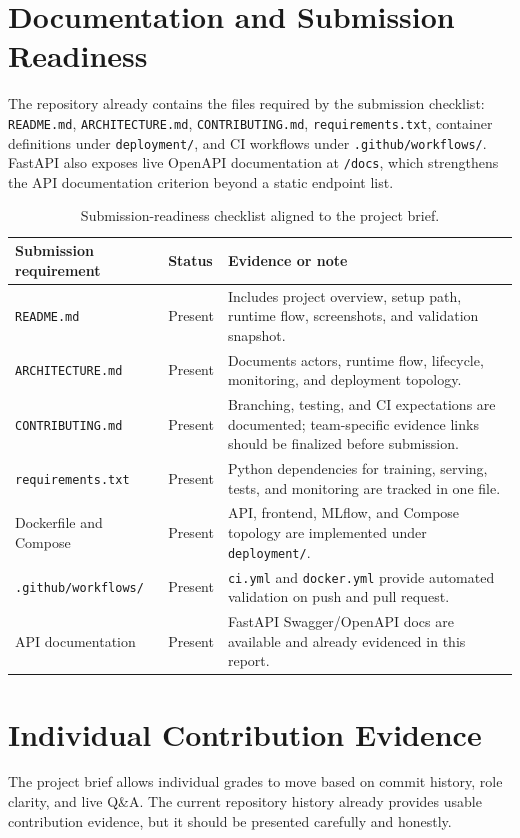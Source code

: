 \documentclass[11pt]{article}
\newcommand{\code}[1]{\texttt{#1}}
\begin{document}
\section{Documentation and Submission Readiness}
The repository already contains the files required by the submission checklist: \code{README.md}, \code{ARCHITECTURE.md}, \code{CONTRIBUTING.md}, \code{requirements.txt}, container definitions under \code{deployment/}, and CI workflows under \code{.github/workflows/}. FastAPI also exposes live OpenAPI documentation at \code{/docs}, which strengthens the API documentation criterion beyond a static endpoint list.

\begin{table}[H]
\small
\centering
\begin{tabularx}{\textwidth}{p{}p{}X}
\toprule
Submission requirement & Status & Evidence or note \\
\midrule
\code{README.md} & Present & Includes project overview, setup path, runtime flow, screenshots, and validation snapshot. \\
\code{ARCHITECTURE.md} & Present & Documents actors, runtime flow, lifecycle, monitoring, and deployment topology. \\
\code{CONTRIBUTING.md} & Present & Branching, testing, and CI expectations are documented; team-specific evidence links should be finalized before submission. \\
\code{requirements.txt} & Present & Python dependencies for training, serving, tests, and monitoring are tracked in one file. \\
Dockerfile and Compose & Present & API, frontend, MLflow, and Compose topology are implemented under \code{deployment/}. \\
\code{.github/workflows/} & Present & \code{ci.yml} and \code{docker.yml} provide automated validation on push and pull request. \\
API documentation & Present & FastAPI Swagger/OpenAPI docs are available and already evidenced in this report. \\
\bottomrule
\end{tabularx}
\caption{Submission-readiness checklist aligned to the project brief.}
\end{table}

\section{Individual Contribution Evidence}
The project brief allows individual grades to move based on commit history, role clarity, and live Q\&A. The current repository history already provides usable contribution evidence, but it should be presented carefully and honestly.
\end{document}
